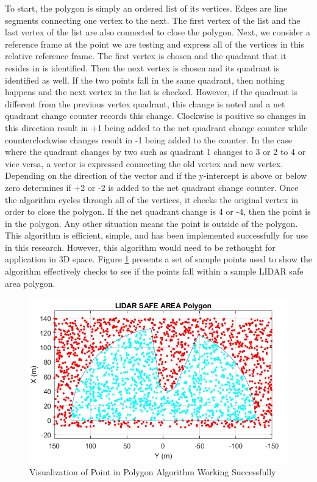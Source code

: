 \documentclass[12pt,onecolumn]{report}
\begin{document}
To start, the polygon is simply an ordered list of its vertices. Edges are line segments connecting one vertex to the next. The first vertex of the list and the last vertex of the list are also connected to close the polygon.   Next, we consider a reference frame at the point we are testing and express all of the vertices in this relative reference frame. The first vertex is chosen and the quadrant that it resides in is identified. Then the next vertex is chosen and its quadrant is identified as well. If the two points fall in the same quadrant, then nothing happens and the next vertex in the list is checked. However, if the quadrant is different from the previous vertex quadrant, this change is noted and a net quadrant change counter records this change. Clockwise is positive so changes in this direction result in +1 being added to the net quadrant change counter while counterclockwise changes result in -1 being added to the counter. In the case where the quadrant changes by two such as quadrant 1 changes to 3 or 2 to 4 or vice versa, a vector is expressed connecting the old vertex and new vertex. Depending on the direction of the vector and if the y-intercept is above or below zero determines if +2 or -2 is added to the net quadrant change counter. Once the algorithm cycles through all of the vertices, it checks the original vertex in order to close the polygon. If the net quadrant change is 4 or -4, then the point is in the polygon. Any other situation means the point is outside of the polygon. This algorithm is efficient, simple, and has been implemented successfully for use in this research. However, this algorithm would need to be rethought for application in 3D space. Figure \ref{fig:PointInPolygon} presents a set of sample points used to show the algorithm effectively checks to see if the points fall within a sample LIDAR safe area polygon.

\begin{figure}
	\centering
	\includegraphics[width=0.7\columnwidth]{Figs/PointInPolygon.png}
	\caption{\small Visualization of Point in Polygon Algorithm Working Successfully}  
	\label{fig:PointInPolygon}
\end{figure}
\end{document}
